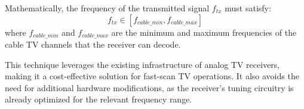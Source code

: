 Mathematically, the frequency of the transmitted signal \( f_{tx} \) must satisfy:
\[
f_{tx} \in [f_{cable\_min}, f_{cable\_max}]
\]
where \( f_{cable\_min} \) and \( f_{cable\_max} \) are the minimum and maximum frequencies of the cable TV channels that the receiver can decode.

This technique leverages the existing infrastructure of analog TV receivers, making it a cost-effective solution for fast-scan TV operations. It also avoids the need for additional hardware modifications, as the receiver’s tuning circuitry is already optimized for the relevant frequency range.

